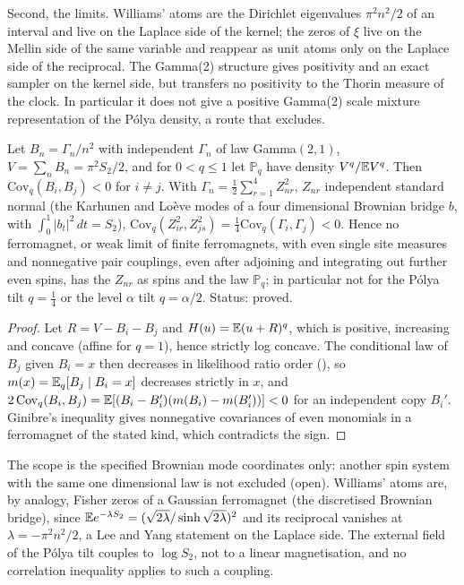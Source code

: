 Second, the limits. Williams' atoms are the Dirichlet eigenvalues $\pi^2n^2/2$ of an interval and live on the Laplace side of the kernel; the zeros of $\xi$ live on the Mellin side of the same variable and reappear as unit atoms only on the Laplace side of the reciprocal. The Gamma(2) structure gives positivity and an exact sampler \cite{Devroye86} on the kernel side, but transfers no positivity to the Thorin measure of the clock. In particular it does not give a positive Gamma(2) scale mixture representation of the P\'olya density, a route that \cite[Section 12.6]{P26} excludes.

\begin{proposition}\label{prop:ch19:ginibre}
Let $B_n=\Gamma_n/n^2$ with independent $\Gamma_n$ of law Gamma$(2,1)$, $V=\sum_nB_n=\pi^2S_2/2$, and for $0<q\le1$ let $\mathbb P_q$ have density $V^q/\mathbb{E} V^q$. Then $\mathrm{Cov}_q(B_i,B_j)<0$ for $i\ne j$. With $\Gamma_n=\frac12\sum_{r=1}^4Z_{nr}^2$, $Z_{nr}$ independent standard normal (the Karhunen and Lo\`eve modes of a four dimensional Brownian bridge $b$, with $\int_0^1|b_t|^2\,dt=S_2$), $\mathrm{Cov}_q(Z_{ir}^2,Z_{js}^2)=\frac14\mathrm{Cov}_q(\Gamma_i,\Gamma_j)<0$. Hence no ferromagnet, or weak limit of finite ferromagnets, with even single site measures and nonnegative pair couplings, even after adjoining and integrating out further even spins, has the $Z_{nr}$ as spins and the law $\mathbb P_q$; in particular not for the P\'olya tilt $q=\frac14$ or the level $\alpha$ tilt $q=\alpha/2$. Status: proved.
\end{proposition}

\begin{proof}
Let $R=V-B_i-B_j$ and $H(u)=\mathbb{E}(u+R)^q$, which is positive, increasing and concave (affine for $q=1$), hence strictly log concave. The conditional law of $B_j$ given $B_i=x$ then decreases in likelihood ratio order (\cite{Karlin68}), so $m(x)=\mathbb{E}_q[B_j\mid B_i=x]$ decreases strictly in $x$, and $2\,\mathrm{Cov}_q(B_i,B_j)=\mathbb{E}[(B_i-B_i')(m(B_i)-m(B_i'))]<0$ for an independent copy $B_i'$. Ginibre's inequality \cite{Ginibre70} gives nonnegative covariances of even monomials in a ferromagnet of the stated kind, which contradicts the sign.
\end{proof}

The scope is the specified Brownian mode coordinates only: another spin system with the same one dimensional law is not excluded (open). Williams' atoms are, by analogy, Fisher zeros of a Gaussian ferromagnet (the discretised Brownian bridge), since $\mathbb{E} e^{-\lambda S_2}=(\sqrt{2\lambda}/\sinh\sqrt{2\lambda})^2$ and its reciprocal vanishes at $\lambda=-\pi^2n^2/2$, a Lee and Yang statement on the Laplace side. The external field of the P\'olya tilt couples to $\log S_2$, not to a linear magnetisation, and no correlation inequality applies to such a coupling.

